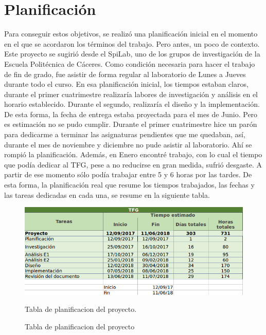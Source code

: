 \documentclass[12pt,a4paper,oneside]{book} %
\begin{document}
\section{Planificación}
Para conseguir estos objetivos, se realizó una planificación inicial en el momento en el que se acordaron los términos del trabajo. Pero antes, un poco de contexto. 
\newline \newline 
Este proyecto se sugirió desde el SpiLab\cite{spilab}, uno de los grupos de investigación de la Escuela Politécnica de Cáceres. Como condición necesaria para hacer el trabajo de fin de grado, fue asistir de forma regular al laboratorio de Lunes a Jueves durante todo el curso. En esa planificación inicial, los tiempos estaban claros, durante el primer cuatrimestre realizaría labores de investigación y análisis en el horario establecido. Durante el segundo, realizaría el diseño y la implementación. De esta forma, la fecha de entrega estaba proyectada para el mes de Junio. 
\newline \newline
Pero es estimación no se pudo cumplir. Durante el primer cuatrimestre hice un parón para dedicarme a terminar las asignaturas pendientes que me quedaban, así, durante el mes de noviembre y diciembre no pude asistir al laboratorio. Ahí se rompió la planificación. Además, en Enero encontré trabajo, con lo cual el tiempo que podía dedicar al TFG, pese a no reducirse en gran medida, sufrió desgaste. A partir de ese momento sólo podía trabajar entre 5 y 6 horas por las tardes. 
\newline \newline 
De esta forma, la planificación real que resume los tiempos trabajados, las fechas y las tareas dedicadas en cada una, se resume en la siguiente tabla. 
\begin{figure}[H]
\begin{center}
	\includegraphics[scale=0.6]{pictures/planificacion.png}
	\caption{Tabla de planificacion del proyecto}{Tabla de planificacion del proyecto.}
    		\label{fig:Tabla de planificacion del proyecto}
\end{center}
\end{figure}
\end{document}
